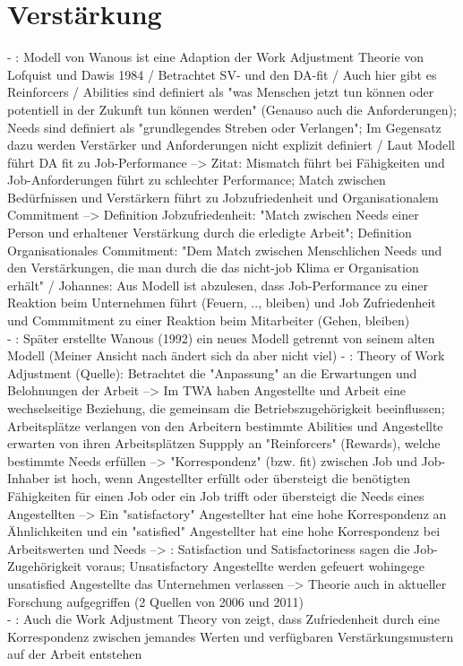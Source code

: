 \section{Verstärkung}
\label{ch:personEnvironmentFit:verstaerkung}
- \cite[S. 34f.]{edwards:2008}: Modell von Wanous ist eine Adaption der Work Adjustment Theorie von Lofquist und Dawis 1984 / Betrachtet SV- und den DA-fit / Auch hier gibt es Reinforcers / Abilities sind definiert als "was Menschen jetzt tun können oder potentiell in der Zukunft tun können werden" (Genauso auch die Anforderungen); Needs sind definiert als "grundlegendes Streben oder Verlangen"; Im Gegensatz dazu werden Verstärker und Anforderungen nicht explizit definiert / Laut Modell führt DA fit zu Job-Performance --> Zitat: Mismatch führt bei Fähigkeiten und Job-Anforderungen führt zu schlechter Performance; Match zwischen Bedürfnissen und Verstärkern führt zu Jobzufriedenheit und Organisationalem Commitment --> Definition Jobzufriedenheit: "Match zwischen Needs einer Person und erhaltener Verstärkung durch die erledigte Arbeit"; Definition Organisationales Commitment: "Dem Match zwischen Menschlichen Needs und den Verstärkungen, die man durch die das nicht-job Klima er Organisation erhält" / Johannes: Aus Modell ist abzulesen, dass Job-Performance zu einer Reaktion beim Unternehmen führt (Feuern, .., bleiben) und Job Zufriedenheit und Commmitment zu einer Reaktion beim Mitarbeiter (Gehen, bleiben) \\
- \cite[S. 35]{edwards:2008}: Später erstellte Wanous (1992) ein neues Modell getrennt von seinem alten Modell (Meiner Ansicht nach ändert sich da aber nicht viel)
- \cite[S. 3]{su:2015}: Theory of Work Adjustment (Quelle): Betrachtet die "Anpassung" an die Erwartungen und Belohnungen der Arbeit --> Im TWA haben Angestellte und Arbeit eine wechselseitige Beziehung, die gemeinsam die Betriebszugehörigkeit beeinflussen; Arbeitsplätze verlangen von den Arbeitern bestimmte Abilities und Angestellte erwarten von ihren Arbeitsplätzen Suppply an "Reinforcers" (Rewards), welche bestimmte Needs erfüllen --> "Korrespondenz" (bzw. fit) zwischen Job und Job-Inhaber ist hoch, wenn Angestellter erfüllt oder übersteigt die benötigten Fähigkeiten für einen Job oder ein Job trifft oder übersteigt die Needs eines Angestellten --> Ein "satisfactory" Angestellter hat eine hohe Korrespondenz an Ähnlichkeiten und ein "satisfied" Angestellter hat eine hohe Korrespondenz bei Arbeitswerten und Needs --> \cite[S. 4]{su:2015}: Satisfaction und Satisfactoriness sagen die Job-Zugehörigkeit voraus; Unsatisfactory Angestellte werden gefeuert wohingege unsatisfied Angestellte das Unternehmen verlassen --> Theorie auch in aktueller Forschung aufgegriffen (2 Quellen von 2006 und 2011) \\
- \cite[S. 3]{edwards:1990}: Auch die Work Adjustment Theory von \textcite{workAdjustment:1964} zeigt, dass Zufriedenheit durch eine Korrespondenz zwischen jemandes Werten und verfügbaren Verstärkungsmustern auf der Arbeit entstehen \\



